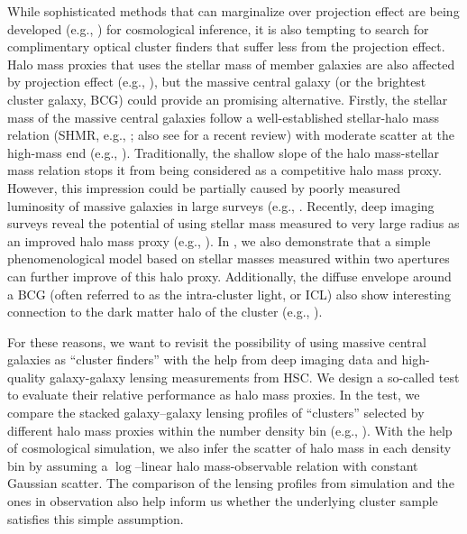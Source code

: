 \documentclass[fleqn,usenatbib,useAMS,english]{mnras}
\begin{document}
    While sophisticated methods that can marginalize over projection effect are being developed
    (e.g., \citealt{To2021a}) for cosmological inference, it is also tempting to search for
    complimentary optical cluster finders that suffer less from the projection effect.
    Halo mass proxies that uses the stellar mass of member galaxies are also affected
    by projection effect (e.g., \citealt{Palmese2020, Bradshaw2020}), but the massive central
    galaxy (or the brightest cluster galaxy, BCG) could provide an promising alternative.
    Firstly, the stellar mass of the massive central galaxies follow a 
    well-established stellar-halo 
    mass relation (SHMR, e.g., \citealt{Leauthaud2012, Tinker2017, Kravtsov2018}; also see
    \citealt{Wechsler2018} for a recent review) with moderate scatter at the high-mass end (e.g.,
    \citealt{More2009, Leauthaud2012, Reddick2013, Zu2015, Lehmann2017, Kravtsov2018}).
    Traditionally, the shallow slope of the halo mass-stellar mass relation stops 
    it from being considered as a competitive halo mass proxy.
    However, this impression could be partially caused by poorly measured luminosity of massive 
    galaxies in large surveys (e.g., \citealt{Bernardi2013, Huang2018b}.
    Recently, deep imaging surveys reveal the potential of using stellar mass measured to very
    large radius as an improved halo mass proxy (e.g., \citealt{Huang2018c, SampaioSantos2021}).
    In \citet{Huang2020}, we also demonstrate that a simple phenomenological model based on
    stellar masses measured within two apertures can further improve of this halo proxy.
    Additionally, the diffuse envelope around a BCG (often referred to as the intra-cluster
    light, or ICL) also show interesting connection to the dark matter halo of the cluster
    (e.g., \citealt{Montes2018, Montes2019, Zhang2019b, Furnell2021}).
    
    For these reasons, we want to revisit the possibility of using massive central galaxies 
    as ``cluster finders'' with the help from deep imaging data and high-quality galaxy-galaxy 
    lensing measurements from HSC.
    We design a so-called \topn{} test to evaluate their relative performance as halo mass proxies.
    In the \topn{} test, we compare the stacked galaxy--galaxy lensing profiles
    of ``clusters'' selected by different halo mass proxies within the number density bin
    (e.g., \citealt{Reyes2008}).
    With the help of cosmological simulation, we also infer the scatter of halo mass in each density
    bin by assuming a $\log$--linear halo mass-observable relation with constant Gaussian 
    scatter.
    The comparison of the lensing profiles from simulation and the ones in observation also help
    inform us whether the underlying cluster sample satisfies this simple assumption.
    
\end{document}
